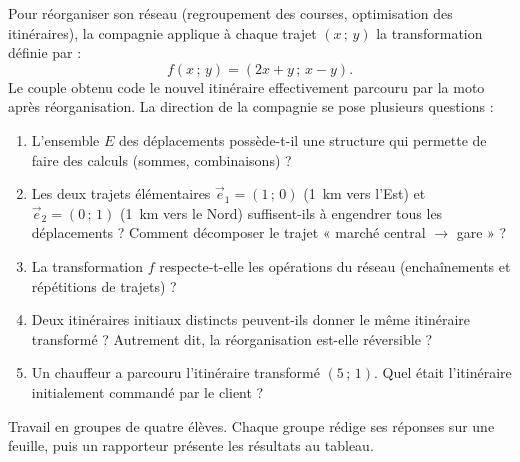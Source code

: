 \documentclass[11pt]{article}
\newcounter{popsec}
\newcounter{popsub}
\newcommand{\courssub}[1]{%
  \stepcounter{popsub}%
  \par\vspace{9pt}\noindent{\popxbold\fontsize{11.5}{13}\selectfont\color{popink}{\color{poporange}\thepopsec.\thepopsub}\hspace{6pt}#1}\par\nopagebreak\vspace{4pt}
}
\begin{document}
Pour réorganiser son réseau (regroupement des courses, optimisation des itinéraires), la compagnie applique à chaque trajet $(x\,;\,y)$ la transformation définie par :
\[
f(x\,;\,y)=(2x+y\,;\,x-y).
\]
Le couple obtenu code le nouvel itinéraire effectivement parcouru par la moto après réorganisation. La direction de la compagnie se pose plusieurs questions :
\begin{enumerate}
\item L'ensemble $E$ des déplacements possède-t-il une structure qui permette de faire des calculs (sommes, combinaisons) ?
\item Les deux trajets élémentaires $\vec{e}_1=(1\,;\,0)$ (\SI{1}{km} vers l'Est) et $\vec{e}_2=(0\,;\,1)$ (\SI{1}{km} vers le Nord) suffisent-ils à engendrer tous les déplacements ? Comment décomposer le trajet « marché central $\to$ gare » ?
\item La transformation $f$ respecte-t-elle les opérations du réseau (enchaînements et répétitions de trajets) ?
\item Deux itinéraires initiaux distincts peuvent-ils donner le même itinéraire transformé ? Autrement dit, la réorganisation est-elle réversible ?
\item Un chauffeur a parcouru l'itinéraire transformé $(5\,;\,1)$. Quel était l'itinéraire initialement commandé par le client ?
\end{enumerate}

\courssub{Consignes}

Travail en groupes de quatre élèves. Chaque groupe rédige ses réponses sur une feuille, puis un rapporteur présente les résultats au tableau.
\end{document}
